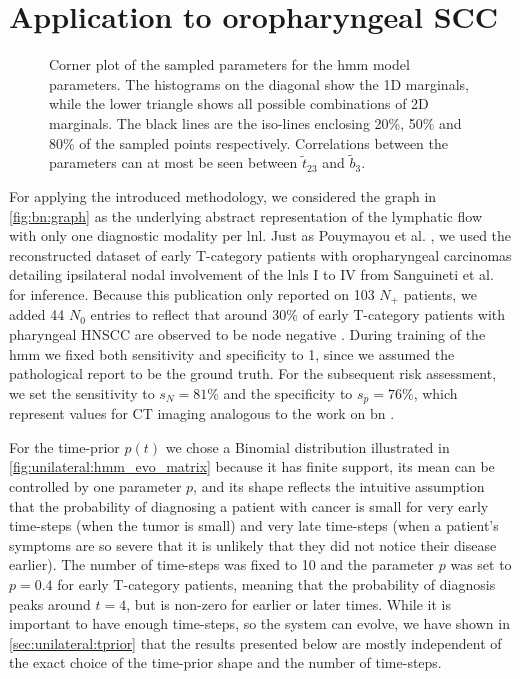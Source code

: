 \documentclass[\relativeRoot/main.tex]{subfiles}
\begin{document}
\section{Application to oropharyngeal SCC}
\label{sec:unilateral:application}



\begin{figure}
    \centering
    \def\svgwidth{1.0\textwidth}
    
    \caption{Corner plot of the sampled parameters for the \gls{hmm} model parameters. The histograms on the diagonal show the 1D marginals, while the lower triangle shows all possible combinations of 2D marginals. The black lines are the iso-lines enclosing 20\%, 50\% and 80\% of the sampled points respectively. Correlations between the parameters can at most be seen between $\tilde{t}_{23}$ and $\tilde{b}_3$.}
    \label{fig:unilateral:corner_hmm}
\end{figure}

For applying the introduced methodology, we considered the graph in \cref{fig:bn:graph} as the underlying abstract representation of the lymphatic flow with only one diagnostic modality per \gls{lnl}. Just as Pouymayou et al. \cite{pouymayou_bayesian_2019}, we used the reconstructed dataset of early T-category patients with oropharyngeal carcinomas detailing ipsilateral nodal involvement of the \glspl{lnl} I to IV from Sanguineti et al. \cite{sanguineti_defining_2009} for inference. Because this publication only reported on 103 $N_+$ patients, we added 44 $N_0$ entries to reflect that around 30\% of early T-category patients with pharyngeal HNSCC are observed to be node negative \cite{gregoire_selection_2000}. During training of the \gls{hmm} we fixed both sensitivity and specificity to 1, since we assumed the pathological report to be the ground truth. For the subsequent risk assessment, we set the sensitivity to $s_N = 81\%$ and the specificity to $s_p = 76\%$, which represent values for CT imaging \cite{de_bondt_detection_2007} analogous to the work on \gls{bn} \cite{pouymayou_bayesian_2019}.
    
For the time-prior $p(t)$ we chose a Binomial distribution illustrated in \cref{fig:unilateral:hmm_evo_matrix} because it has finite support, its mean can be controlled by one parameter $p$, and its shape reflects the intuitive assumption that the probability of diagnosing a patient with cancer is small for very early time-steps (when the tumor is small) and very late time-steps (when a patient's symptoms are so severe that it is unlikely that they did not notice their disease earlier). The number of time-steps was fixed to 10 and the parameter $p$ was set to $p = 0.4$ for early T-category patients, meaning that the probability of diagnosis peaks around $t = 4$, but is non-zero for earlier or later times. While it is important to have enough time-steps, so the system can evolve, we have shown in \cref{sec:unilateral:tprior} that the results presented below are mostly independent of the exact choice of the time-prior shape and the number of time-steps.
\end{document}
